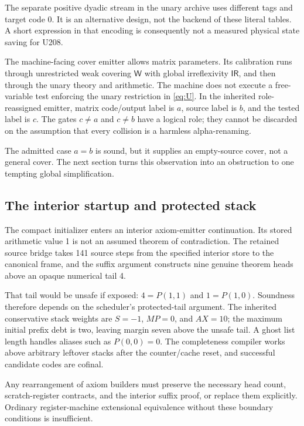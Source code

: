 \documentclass[11pt,a4paper]{article}
\newcommand{\WW}{\mathsf{W}}
\newcommand{\IR}{\mathsf{IR}}
\begin{document}
The separate positive dyadic stream in the unary archive uses different
tags and target code 0. It is an alternative design, not the backend of
these literal tables. A short expression in that encoding is consequently
not a measured physical state saving for U208.

The machine-facing cover emitter allows matrix parameters. Its calibration
runs through unrestricted weak covering $\WW$ with global irreflexivity
$\IR$, and then through the unary theory and arithmetic. The machine does
not execute a free-variable test enforcing the unary restriction in
\eqref{eq:U}. In the inherited role-reassigned emitter, matrix code/output
label is $a$, source label is $b$, and the tested label is $c$. The gates
$c\ne a$ and $c\ne b$ have a logical role; they cannot be discarded on the
assumption that every collision is a harmless alpha-renaming.

The admitted case $a=b$ is sound, but it supplies an empty-source cover,
not a general cover. The next section turns this observation into an
obstruction to one tempting global simplification.

\subsection{The interior startup and protected stack}

The compact initializer enters an interior axiom-emitter continuation.
Its stored arithmetic value 1 is not an assumed theorem of contradiction.
The retained source bridge takes 141 source steps from the specified
interior store to the canonical frame, and the suffix argument constructs
nine genuine theorem heads above an opaque numerical tail 4.

That tail would be unsafe if exposed: $4=P(1,1)$ and $1=P(1,0)$. Soundness
therefore depends on the scheduler's protected-tail argument. The inherited
conservative stack weights are $S=-1$, $MP=0$, and $AX=10$; the maximum
initial prefix debt is two, leaving margin seven above the unsafe tail.
A ghost list length handles aliases such as $P(0,0)=0$. The completeness
compiler works above arbitrary leftover stacks after the counter/cache
reset, and successful candidate codes are cofinal.

Any rearrangement of axiom builders must preserve the necessary head count,
scratch-register contracts, and the interior suffix proof, or replace them
explicitly. Ordinary register-machine extensional equivalence without
these boundary conditions is insufficient.
\end{document}
